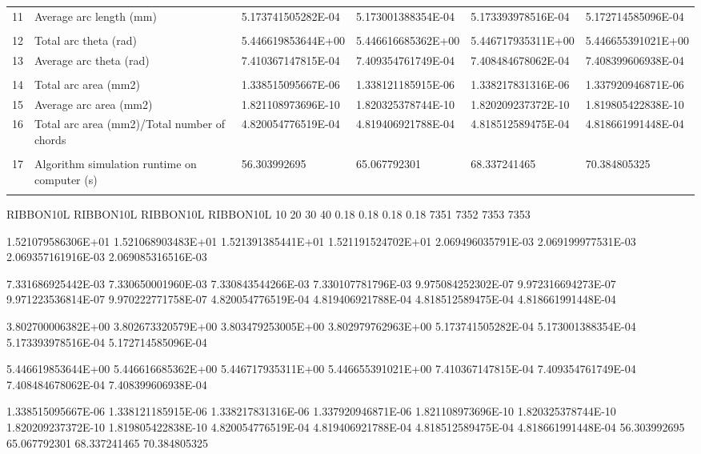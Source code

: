 \begin{tabular}{ p{0.5cm} p{8.0cm} p{4.00cm} p{4.0cm} p{4.00cm} p{4.0cm}}
11	& Average arc length (mm)	                           & 5.173741505282E-04	& 5.173001388354E-04   & 5.173393978516E-04	& 5.172714585096E-04 \\
	&                                                      &                    &                      &                    & \\
12	& Total arc theta (rad)	                               & 5.446619853644E+00	& 5.446616685362E+00   & 5.446717935311E+00	& 5.446655391021E+00 \\
13	& Average arc theta (rad)	                           & 7.410367147815E-04	& 7.409354761749E-04   & 7.408484678062E-04	& 7.408399606938E-04 \\
	&                                                      &                    &                      &                    & \\
14	& Total arc area (mm2)	                               & 1.338515095667E-06	& 1.338121185915E-06   & 1.338217831316E-06	& 1.337920946871E-06 \\
15	& Average arc area (mm2)	                           & 1.821108973696E-10	& 1.820325378744E-10   & 1.820209237372E-10	& 1.819805422838E-10 \\
16	& Total arc area (mm2)/Total number of chords	       & 4.820054776519E-04	& 4.819406921788E-04   & 4.818512589475E-04	& 4.818661991448E-04 \\
	&                                                      &                    &                      &                    & \\
17	& Algorithm simulation runtime on computer (s)         & 56.303992695	    & 65.067792301	       & 68.337241465	    & 70.384805325 \\
	&                                                      &                    &                      &                    & 
\end{tabular}


RIBBON10L	RIBBON10L	RIBBON10L	RIBBON10L
10	20	30	40
0.18	0.18	0.18	0.18
7351	7352	7353	7353

1.521079586306E+01	1.521068903483E+01	1.521391385441E+01	1.521191524702E+01
2.069496035791E-03	2.069199977531E-03	2.069357161916E-03	2.069085316516E-03

7.331686925442E-03	7.330650001960E-03	7.330843544266E-03	7.330107781796E-03
9.975084252302E-07	9.972316694273E-07	9.971223536814E-07	9.970222771758E-07
4.820054776519E-04	4.819406921788E-04	4.818512589475E-04	4.818661991448E-04

3.802700006382E+00	3.802673320579E+00	3.803479253005E+00	3.802979762963E+00
5.173741505282E-04	5.173001388354E-04	5.173393978516E-04	5.172714585096E-04

5.446619853644E+00	5.446616685362E+00	5.446717935311E+00	5.446655391021E+00
7.410367147815E-04	7.409354761749E-04	7.408484678062E-04	7.408399606938E-04

1.338515095667E-06	1.338121185915E-06	1.338217831316E-06	1.337920946871E-06
1.821108973696E-10	1.820325378744E-10	1.820209237372E-10	1.819805422838E-10
4.820054776519E-04	4.819406921788E-04	4.818512589475E-04	4.818661991448E-04
56.303992695	65.067792301	68.337241465	70.384805325

